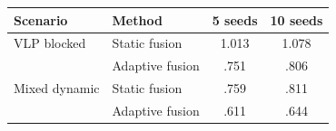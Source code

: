 \begin{tabular}{@{}llcc@{}}
\toprule
Scenario & Method & 5 seeds & 10 seeds \\
\midrule
VLP blocked & Static fusion & 1.013 & 1.078 \\
 & Adaptive fusion & .751 & .806 \\
\midrule
Mixed dynamic & Static fusion & .759 & .811 \\
 & Adaptive fusion & .611 & .644 \\
\bottomrule
\end{tabular}
